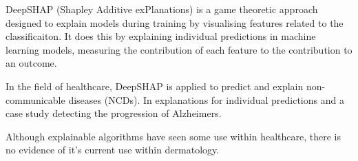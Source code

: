 DeepSHAP (Shapley Additive exPlanations) is a game theoretic approach designed to explain models during training by visualising features related to the classificaiton. It does this by explaining individual predictions in machine learning models, measuring the contribution of each feature to the contribution to an outcome\cite{Aas2021}.

In the field of healthcare, DeepSHAP is applied to predict and explain non-communicable diseases (NCDs). In explanations for individual predictions and a case study detecting the progression of Alzheimers. 

Although explainable algorithms have seen some use within healthcare, there is no evidence of it's current use within dermatology.



